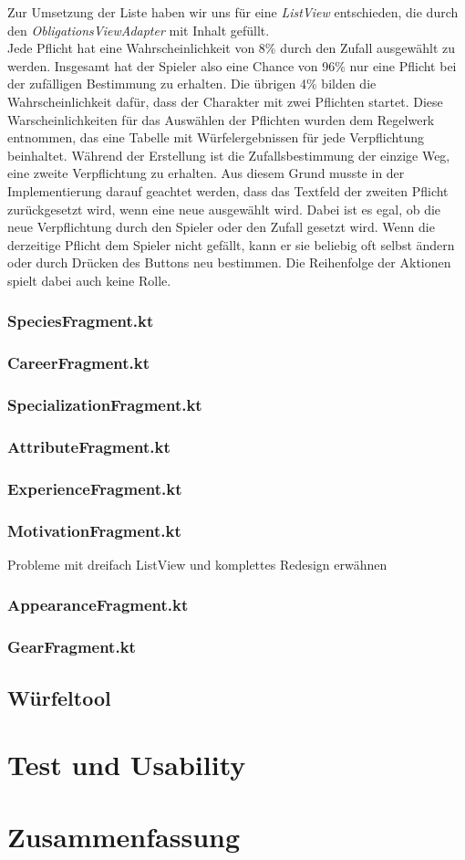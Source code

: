 Zur Umsetzung der Liste haben wir uns für eine \textit{ListView} entschieden, die durch den \textit{ObligationsViewAdapter} mit Inhalt gefüllt.\\

Jede Pflicht hat eine Wahrscheinlichkeit von 8\% durch den Zufall ausgewählt zu werden. Insgesamt hat der Spieler also eine Chance von 96\% nur eine Pflicht bei der zufälligen Bestimmung zu erhalten. Die übrigen 4\% bilden die Wahrscheinlichkeit dafür, dass der Charakter mit zwei Pflichten startet. Diese Warscheinlichkeiten für das Auswählen der Pflichten wurden dem Regelwerk\cite[39]{rulebook} entnommen, das eine Tabelle mit Würfelergebnissen für jede Verpflichtung beinhaltet. Während der Erstellung ist die Zufallsbestimmung der einzige Weg, eine zweite Verpflichtung zu erhalten. Aus diesem Grund musste in der Implementierung darauf geachtet werden, dass das Textfeld der zweiten Pflicht zurückgesetzt wird, wenn eine neue ausgewählt wird. Dabei ist es egal, ob die neue Verpflichtung durch den Spieler oder den Zufall gesetzt wird. Wenn die derzeitige Pflicht dem Spieler nicht gefällt, kann er sie beliebig oft selbst ändern oder durch Drücken des Buttons neu bestimmen. Die Reihenfolge der Aktionen spielt dabei auch keine Rolle.\\

\subsubsection{SpeciesFragment.kt}
\subsubsection{CareerFragment.kt}
\subsubsection{SpecializationFragment.kt}
\subsubsection{AttributeFragment.kt}
\subsubsection{ExperienceFragment.kt}
\subsubsection{MotivationFragment.kt}
Probleme mit dreifach ListView und komplettes Redesign erwähnen
\subsubsection{AppearanceFragment.kt}
\subsubsection{GearFragment.kt}

\subsection{Würfeltool}


\section{Test und Usability}

\section{Zusammenfassung}